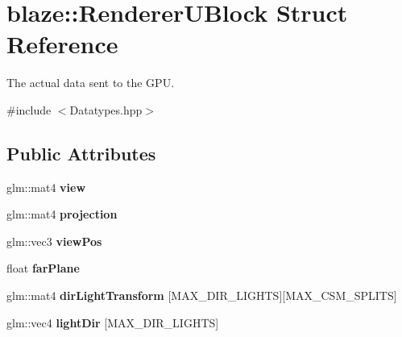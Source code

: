 \hypertarget{structblaze_1_1RendererUBlock}{}\section{blaze\+:\+:Renderer\+U\+Block Struct Reference}
\label{structblaze_1_1RendererUBlock}


The actual data sent to the G\+PU.  




{\ttfamily \#include $<$Datatypes.\+hpp$>$}

\subsection*{Public Attributes}
\begin{DoxyCompactItemize}
\item 
\mbox{\label{structblaze_1_1RendererUBlock_ac65ac83021eeffecb713e06e55962c4f}} 
glm\+::mat4 {\bfseries view}
\item 
\mbox{\label{structblaze_1_1RendererUBlock_aa7b90e03ccef455ca6a170a86bd80a27}} 
glm\+::mat4 {\bfseries projection}
\item 
\mbox{\label{structblaze_1_1RendererUBlock_a2e241d07462482fd2f5b0234b45713f6}} 
glm\+::vec3 {\bfseries view\+Pos}
\item 
\mbox{\label{structblaze_1_1RendererUBlock_a36afd164735550caa113bdca3dda1e62}} 
float {\bfseries far\+Plane}
\item 
\mbox{\label{structblaze_1_1RendererUBlock_a80d7fc6724c063497fc0b6fa1d69db5b}} 
glm\+::mat4 {\bfseries dir\+Light\+Transform} \mbox{[}M\+A\+X\+\_\+\+D\+I\+R\+\_\+\+L\+I\+G\+H\+TS\mbox{]}\mbox{[}M\+A\+X\+\_\+\+C\+S\+M\+\_\+\+S\+P\+L\+I\+TS\mbox{]}
\item 
\mbox{\label{structblaze_1_1RendererUBlock_ada0b30a8e4dcc3adcfcdba842f2d0592}} 
glm\+::vec4 {\bfseries light\+Dir} \mbox{[}M\+A\+X\+\_\+\+D\+I\+R\+\_\+\+L\+I\+G\+H\+TS\mbox{]}
\item 
\mbox{\label{structblaze_1_1RendererUBlock_a8a7e1970d8aa9c9176cf100bf8620ba0}} 

\end{DoxyCompactItemize}

